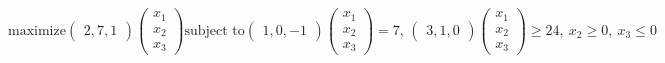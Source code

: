 \documentclass{article} %
\begin{document}
    $
        \text{maximize} \begin{pmatrix}
            2, 7, 1
        \end{pmatrix}
        \begin{pmatrix}
            x_1 \\
            x_2 \\
            x_3
        \end{pmatrix}
        \text{subject to}
        \begin{pmatrix}
            1, 0, -1
        \end{pmatrix} 
        \begin{pmatrix}
            x_1 \\
            x_2 \\
            x_3
        \end{pmatrix} = 7
        \text{, }
        \begin{pmatrix}
            3, 1, 0
        \end{pmatrix} 
        \begin{pmatrix}
            x_1 \\
            x_2 \\
            x_3
        \end{pmatrix}\geq 24,\
        x_2 \geq 0,\
        x_3 \leq 0
        $
\end{document}
